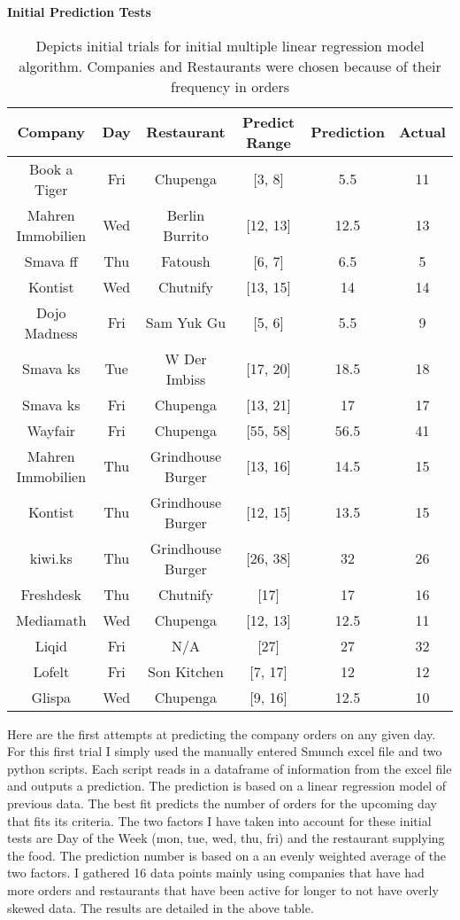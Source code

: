 \documentclass[12pt]{article}
\begin{document}
\begin{table}[h!]
\begin{center}
\textbf{Initial Prediction Tests} \\ [1.2ex]

 \begin{tabular}{||c c c c c c||} 
 \hline
 \textbf{Company}&\textbf{Day}&\textbf{Restaurant}&\textbf{Predict  Range}&\textbf{Prediction}&\textbf{Actual}\\ [0.7ex] 
 \hline\hline
 Book a Tiger&Fri&Chupenga&[3, 8]&5.5&11  \\ [1ex]
 \hline
 Mahren Immobilien&Wed&Berlin Burrito&[12, 13]&12.5&13  \\ [1ex]
 \hline
 Smava ff&Thu&Fatoush&[6, 7]&6.5&5  \\ [1ex]
 \hline
 Kontist&Wed&Chutnify&[13, 15]&14&14 \\ [1ex]
 \hline
  Dojo Madness&Fri&Sam Yuk Gu&[5, 6]&5.5&9 \\ [1ex]
 \hline
 Smava ks&Tue&W Der Imbiss&[17, 20]&18.5&18 \\ [1ex]
\hline
 Smava ks&Fri&Chupenga&[13, 21]&17&17 \\ [1ex]
\hline
 Wayfair&Fri&Chupenga&[55, 58]&56.5&41 \\ [1ex]
\hline
Mahren Immobilien&Thu&Grindhouse Burger&[13, 16]&14.5&15 \\ [1ex]
\hline
Kontist&Thu&Grindhouse Burger&[12, 15]&13.5&15 \\ [1ex]
\hline
kiwi.ks&Thu&Grindhouse Burger&[26, 38]&32&26 \\ [1ex]
\hline
Freshdesk&Thu&Chutnify&[17]&17&16 \\ [1ex]
\hline
Mediamath&Wed&Chupenga&[12, 13]&12.5&11 \\ [1ex]
\hline
Liqid&Fri&N/A&[27]&27&32 \\ [1ex]
\hline
Lofelt&Fri&Son Kitchen&[7, 17]&12&12 \\ [1ex]
\hline
Glispa&Wed&Chupenga&[9, 16]&12.5&10 \\ [1ex]
\hline
\end{tabular}
\caption{Depicts initial trials for initial multiple linear regression model algorithm. Companies and Restaurants were chosen because of their frequency in orders}
\label{}
\end{center}
\end{table}

Here are the first attempts at predicting the company orders on any given day. For this first trial I simply used the manually entered Smunch excel file and two python scripts. Each script reads in a dataframe of information from the excel file and outputs a prediction. The prediction is based on a linear regression model of previous data. The best fit predicts the number of orders for the upcoming day that fits its criteria. The two factors I have taken into account for these initial tests are Day of the Week (mon, tue, wed, thu, fri) and the restaurant supplying the food. The prediction number is based on a an evenly weighted average of the two factors. I gathered 16 data points mainly using companies that have had more orders and restaurants that have been active for longer to not have overly skewed data. The results are detailed in the above table. 
\end{document}

